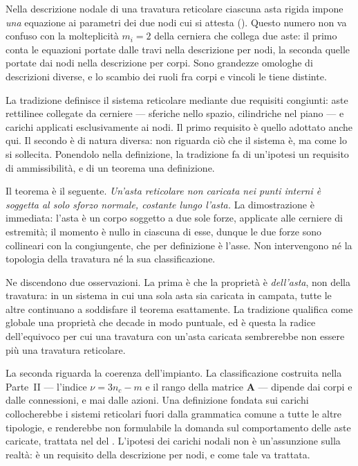 \begin{oss}\label{oss:una_eq_vs_molteplicita}
	Nella descrizione nodale di una travatura reticolare ciascuna asta rigida impone \emph{una} 
	equazione ai parametri dei due nodi cui si attesta (). Questo numero non
	va confuso con la molteplicità $m_i = 2$ della cerniera
	che collega due aste: il primo conta le equazioni portate
	dalle travi nella descrizione per nodi, la seconda quelle
	portate dai nodi nella descrizione per corpi. Sono
	grandezze omologhe di descrizioni diverse, e lo scambio
	dei ruoli fra corpi e vincoli le tiene distinte.
\end{oss}

	\begin{oss}\label{oss:def_reticolare_tradizione}
		La tradizione definisce il sistema reticolare mediante
		due requisiti congiunti: aste rettilinee collegate da
		cerniere --- sferiche nello spazio, cilindriche nel
		piano --- e carichi applicati esclusivamente ai nodi.
		Il primo requisito è quello adottato anche qui. Il
		secondo è di natura diversa: non riguarda ciò che il
		sistema è, ma come lo si sollecita. Ponendolo nella
		definizione, la tradizione fa di un'ipotesi un
		requisito di ammissibilità, e di un teorema una
		definizione.
		
		Il teorema è il seguente. \emph{Un'asta reticolare non
			caricata nei punti interni è soggetta al solo sforzo
			normale, costante lungo l'asta.} La dimostrazione è
		immediata: l'asta è un corpo soggetto a due sole forze,
		applicate alle cerniere di estremità; il momento è nullo
		in ciascuna di esse, dunque le due forze sono collineari
		con la congiungente, che per definizione è l'asse. Non
		intervengono né la topologia della travatura né la sua
		classificazione.
		
		Ne discendono due osservazioni. La prima è che la
		proprietà è \emph{dell'asta}, non della travatura: in un
		sistema in cui una sola asta sia caricata in campata,
		tutte le altre continuano a soddisfare il teorema
		esattamente. La tradizione qualifica come globale una
		proprietà che decade in modo puntuale, ed è questa la
		radice dell'equivoco per cui una travatura con un'asta
		caricata sembrerebbe non essere più una travatura
		reticolare.
		
		La seconda riguarda la coerenza dell'impianto. La
		classificazione costruita nella Parte~II --- l'indice
		$\nu = 3n_c - m$ e il rango della matrice $\bm{A}$ ---
		dipende dai corpi e dalle connessioni, e mai dalle
		azioni. Una definizione fondata sui carichi collocherebbe
		i sistemi reticolari fuori dalla grammatica comune a
		tutte le altre tipologie, e renderebbe non formulabile la
		domanda sul comportamento delle aste caricate, trattata
		nel  del
		. L'ipotesi dei carichi nodali non
		è un'assunzione sulla realtà: è un requisito della
		descrizione per nodi, e come tale va trattata.
\end{oss}


